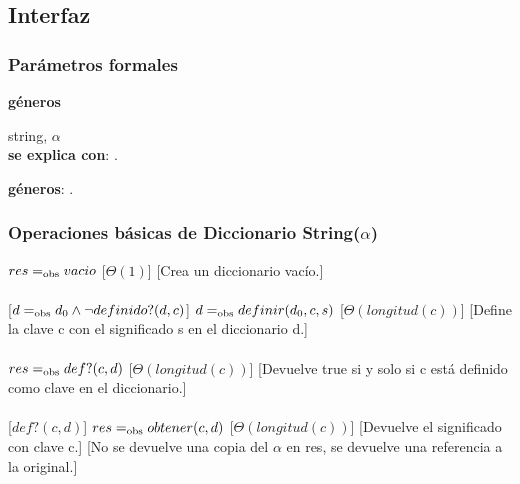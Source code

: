 \subsection{Interfaz}


  \subsubsection{Par\'ametros formales}
   \parbox{1.7cm}{\textbf{g\'eneros}} string, $\alpha$\\

  \textbf{se explica con}: .

  \textbf{g\'eneros}: .

  \subsubsection{Operaciones b\'asicas de Diccionario String($\alpha$)}
  {$res =_{\mathrm{obs}} vacio$}%
  [$\Theta(1)$]
  [Crea un diccionario vac\'io.]\\\\
  [$d =_{\mathrm{obs}} d_0 \wedge \neg definido?(d,c)$]
  {$d =_{\mathrm{obs}} definir(d_0,c,s)$}%
  [$\Theta(longitud(c))$]
  [Define la clave c con el significado s en el diccionario d.]\\\\
  {$res =_{\mathrm{obs}} def?(c,d)$}%
  [$\Theta(longitud(c))$]
  [Devuelve true si y solo si c est\'a definido como clave en el diccionario.]\\\\
  [$def?(c,d)$]
  {$res =_{\mathrm{obs}} obtener(c,d)$}%
  [$\Theta(longitud(c))$]
  [Devuelve el significado con clave c.]
  [No se devuelve una copia del $\alpha$ en res, se devuelve una referencia a la original.]\\\\

